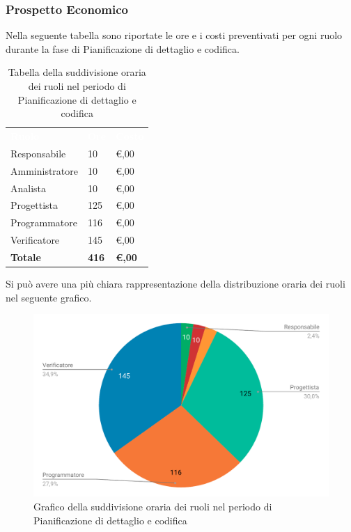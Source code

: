 \subsubsection{Prospetto Economico}
Nella seguente tabella sono riportate le ore e i costi preventivati per ogni ruolo durante la fase di Pianificazione di dettaglio e codifica.


\begin{table}[H]	
	\begin{center}
	    \begin{tabular}{C{4cm}C{1cm}C{3,5cm}}
			\textcolor{white}{\textbf{Ruolo}} & \textcolor{white}{\textbf{Ore}} & \textcolor{white}{\textbf{Costo}}
			\\ 
			Responsabile & 10 & \euro {},00 \\
			Amministratore & 10 & \euro {},00 \\
			Analista & 10 & \euro {},00 \\
			Progettista & 125 & \euro {},00 \\
			Programmatore & 116 & \euro {},00 \\
			Verificatore & 145 & \euro {},00 \\
			\textbf{Totale} & \textbf{416} & \textbf{\euro {},00} \\
		\end{tabular}
	    \caption{Tabella della suddivisione oraria dei ruoli nel periodo di Pianificazione di dettaglio e codifica} \label{tab:tabellaRuoliPianificazione di dettaglio e codifica} 
	\end{center}
\end{table}


Si può avere una più chiara rappresentazione della distribuzione oraria dei ruoli nel seguente grafico.

\begin{figure}[H]
	\includegraphics[width=1\linewidth]{Preventivo/grafici/PC2.pdf}
	\caption{Grafico della suddivisione oraria dei ruoli nel periodo di Pianificazione di dettaglio e codifica}
\end{figure}

